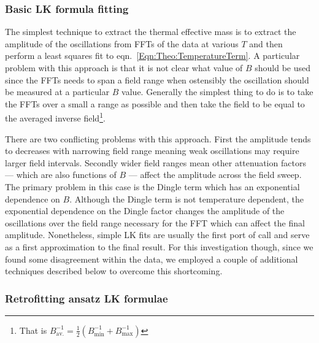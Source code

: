 \subsubsection{Basic \ac{LK} formula fitting}

The simplest technique to extract the thermal effective mass is to extract the amplitude of the oscillations from \acp{FFT} of the data at various $T$ and then perform a least squares fit to eqn.~\ref{Eqn:Theo:TemperatureTerm}. A particular problem with this approach is that it is not clear what value of $B$ should be used since the \acp{FFT} needs to span a field range when ostensibly the oscillation should be measured at a particular $B$ value. Generally the simplest thing to do is to take the \acp{FFT} over a small a range as possible and then take the field to be equal to the averaged inverse field\footnote{That is $B_{\textrm{av.}}^{-1} = \frac{1}{2}(B_{\textrm{min}}^{-1} + B_{\textrm{max}}^{-1})$}. 

There are two conflicting problems with this approach. First the amplitude tends to decreases with narrowing field range meaning weak oscillations may require larger field intervals. Secondly wider field ranges mean other attenuation factors --- which are also functions of $B$ --- affect the amplitude across the field sweep. The primary problem in this case is the Dingle term which has an exponential dependence on $B$. Although the Dingle term is not temperature dependent, the exponential dependence on the Dingle factor changes the amplitude of the oscillations over the field range necessary for the \ac{FFT} which can affect the final amplitude. Nonetheless, simple \ac{LK} fits are usually the first port of call and serve as a first approximation to the final result. For this investigation though, since we found some disagreement within the data, we employed a couple of additional techniques described below to overcome this shortcoming.

\subsubsection{Retrofitting ansatz \ac{LK} formulae}
\label{Sec:Exp:LKRetrofitting}


